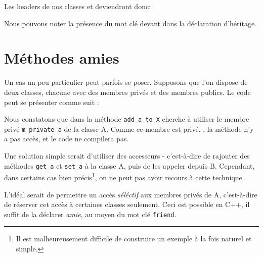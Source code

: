 Les headers de nos classes  et  deviendront donc:



Nous pouvons noter la pr\'esence du mot cl\'e  devant  dans la d\'eclaration d'h\'eritage.


\section{M\'ethodes amies}

Un cas un peu particulier peut parfois se poser. Supposons que l'on dispose de
deux classes, chacune avec des membres priv\'es et des membres publics. Le code
peut se pr\'esenter comme suit :




Nous constatons que dans la m\'ethode \texttt{add\_a\_to\_X} cherche \`a
utiliser le membre priv\'e \texttt{m\_private\_a} de la classe A. Comme ce
membre est priv\'e, , la m\'ethode n'y a pas acc\`es, et le code ne compilera
pas.

Une solution simple serait d'utiliser des accesseurs - c'est-\`a-dire de
rajouter des m\'ethodes \texttt{get\_a} et \texttt{set\_a} \`a la classe A,
puis de les appeler depuis B. Cependant, dans certains cas bien
pr\'ecis\footnote{Il est malheureusement difficile de construire un exemple \`a
la fois naturel et simple.}, on ne peut pas avoir recours \`a cette technique.

L'id\'eal serait de permettre un acc\`es \emph{s\'el\'ectif} aux membres
priv\'es de A, c'est-\`a-dire de r\'eserver cet acc\`es \`a certaines classes
seulement. Ceci est possible en C++, il suffit de la d\'eclarer \emph{amie}, au
moyen du mot cl\'e \texttt{friend}.





